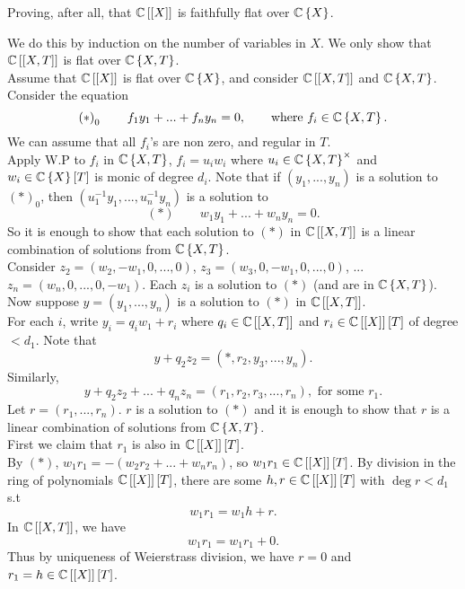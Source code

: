 Proving, after all, that $\mathbb{C}\left[\left[X\right]\right]$ is faithfully
flat over $\mathbb{C}\left\{ X\right\} $.

We do this by induction on the number of variables in $X$. We only
show that $\mathbb{C}\left[\left[X,T\right]\right]$ is flat over $\mathbb{C}\left\{ X,T\right\} $.\\
Assume that $\mathbb{C}\left[\left[X\right]\right]$ is flat over $\mathbb{C}\left\{ X\right\} $,
and consider $\mathbb{C}\left[\left[X,T\right]\right]$ and $\mathbb{C}\left\{ X,T\right\} $.
\\
Consider the equation 
\[
\left(\ast\right)_{0}\qquad f_{1}y_{1}+...+f_{n}y_{n}=0,\qquad\textrm{where }f_{i}\in\mathbb{C}\left\{ X,T\right\} .
\]
We can assume that all $f_{i}$'s are non zero, and regular in $T$.
\\
Apply W.P to $f_{i}$ in $\mathbb{C}\left\{ X,T\right\} $, $f_{i}=u_{i}w_{i}$
where $u_{i}\in\mathbb{C}\left\{ X,T\right\} ^{\times}$ and $w_{i}\in\mathbb{C}\left\{ X\right\} \left[T\right]$
is monic of degree $d_{i}$. Note that if $\left(y_{1},...,y_{n}\right)$
is a solution to $\left(\ast\right)_{0}$, then $\left(u_{1}^{-1}y_{1},...,u_{n}^{-1}y_{n}\right)$
is a solution to 
\[
\left(\ast\right)\qquad w_{1}y_{1}+...+w_{n}y_{n}=0.
\]
So it is enough to show that each solution to $\left(\ast\right)$
in $\mathbb{C}\left[\left[X,T\right]\right]$ is a linear combination of solutions
from $\mathbb{C}\left\{ X,T\right\} $.\\
Consider $z_{2}=\left(w_{2},-w_{1},0,...,0\right)$, $z_{3}=\left(w_{3},0,-w_{1},0,...,0\right)$,
... $z_{n}=\left(w_{n},0,...,0,-w_{1}\right)$. Each $z_{i}$ is a
solution to $\left(\ast\right)$ (and are in $\mathbb{C}\left\{ X,T\right\} $).\\
Now suppose $y=\left(y_{1},...,y_{n}\right)$ is a solution to $\left(\ast\right)$
in $\mathbb{C}\left[\left[X,T\right]\right]$. \\
For each $i$, write $y_{i}=q_{i}w_{1}+r_{i}$ where $q_{i}\in\mathbb{C}\left[\left[X,T\right]\right]$
and $r_{i}\in\mathbb{C}\left[\left[X\right]\right]\left[T\right]$ of degree
$<d_{1}$. Note that
\[
y+q_{2}z_{2}=\left(\ast,r_{2},y_{3},...,y_{n}\right).
\]
Similarly,
\[
y+q_{2}z_{2}+...+q_{n}z_{n}=\left(r_{1},r_{2},r_{3},...,r_{n}\right),\textrm{ for some }r_{1}.
\]
Let $r=\left(r_{1},...,r_{n}\right)$. $r$ is a solution to $\left(\ast\right)$
and it is enough to show that $r$ is a linear combination of solutions
from $\mathbb{C}\left\{ X,T\right\} $.\\
First we claim that $r_{1}$ is also in $\mathbb{C}\left[\left[X\right]\right]\left[T\right]$.\\
By $\left(\ast\right)$, $w_{1}r_{1}=-\left(w_{2}r_{2}+...+w_{n}r_{n}\right)$,
so $w_{1}r_{1}\in\mathbb{C}\left[\left[X\right]\right]\left[T\right]$. By
division in the ring of polynomials $\mathbb{C}\left[\left[X\right]\right]\left[T\right]$,
there are some $h,r\in\mathbb{C}\left[\left[X\right]\right]\left[T\right]$
with $\deg r<d_{1}$ s.t 
\[
w_{1}r_{1}=w_{1}h+r.
\]
In $\mathbb{C}\left[\left[X,T\right]\right]$, we have
\[
w_{1}r_{1}=w_{1}r_{1}+0.
\]
Thus by uniqueness of Weierstrass division, we have $r=0$ and $r_{1}=h\in\mathbb{C}\left[\left[X\right]\right]\left[T\right]$. 

